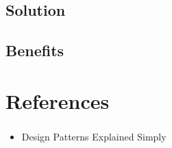 \documentclass{beamer}
\begin{document}
\subsection{Solution}
\begin{frame}
\frametitle{}
\end{frame}

\subsection{Benefits}
\begin{frame}
\frametitle{}
\end{frame}
\section{References}
\begin{frame}
\frametitle{}
\begin{itemize}
\item Design Patterns Explained Simply
\end{itemize}

\end{frame}
\end{document}
